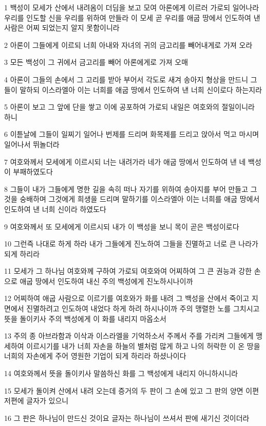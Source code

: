 \par 1 백성이 모세가 산에서 내려옴이 더딤을 보고 모여 아론에게 이르러 가로되 일어나라 우리를 인도할 신을 우리를 위하여 만들라 이 모세 곧 우리를 애굽 땅에서 인도하여 낸 사람은 어찌 되었는지 알지 못함이니라
\par 2 아론이 그들에게 이르되 너희 아내와 자녀의 귀의 금고리를 빼어내게로 가져 오라
\par 3 모든 백성이 그 귀에서 금고리를 빼어 아론에게로 가져 오매
\par 4 아론이 그들의 손에서 그 고리를 받아 부어서 각도로 새겨 송아지 형상을 만드니 그들이 말하되 이스라엘아 이는 너희를 애굽 땅에서 인도하여 낸 너희 신이로다 하는지라
\par 5 아론이 보고 그 앞에 단을 쌓고 이에 공포하여 가로되 내일은 여호와의 절일이니라 하니
\par 6 이튿날에 그들이 일찌기 일어나 번제를 드리며 화목제를 드리고 앉아서 먹고 마시며 일어나서 뛰놀더라
\par 7 여호와께서 모세에게 이르시되 너는 내려가라 네가 애굽 땅에서 인도하여 낸 네 백성이 부패하였도다
\par 8 그들이 내가 그들에게 명한 길을 속히 떠나 자기를 위하여 송아지를 부어 만들고 그것을 숭배하며 그것에게 희생을 드리며 말하기를 이스라엘아 이는 너희를 애굽 땅에서 인도하여 낸 너희 신이라 하였도다
\par 9 여호와께서 또 모세에게 이르시되 내가 이 백성을 보니 목이 곧은 백성이로다
\par 10 그런즉 나대로 하게 하라 내가 그들에게 진노하여 그들을 진멸하고 너로 큰 나라가 되게 하리라
\par 11 모세가 그 하나님 여호와께 구하여 가로되 여호와여 어찌하여 그 큰 권능과 강한 손으로 애굽 땅에서 인도하여 내신 주의 백성에게 진노하시나이까
\par 12 어찌하여 애굽 사람으로 이르기를 여호와가 화를 내려 그 백성을 산에서 죽이고 지면에서 진멸하려고 인도하여 내었다 하게 하려 하시나이까 주의 맹렬한 노를 그치시고 뜻을 돌이키사 주의 백성에게 이 화를 내리지 마옵소서
\par 13 주의 종 아브라함과 이삭과 이스라엘을 기억하소서 주께서 주를 가리켜 그들에게 맹세하여 이르시기를 내가 너희 자손을 하늘의 별처럼 많게 하고 나의 허락한 이 온 땅을 너희의 자손에게 주어 영원한 기업이 되게 하리라 하셨나이다
\par 14 여호와께서 뜻을 돌이키사 말씀하신 화를 그 백성에게 내리지 아니하시니라
\par 15 모세가 돌이켜 산에서 내려 오는데 증거의 두 판이 그 손에 있고 그 판의 양면 이편 저편에 글자가 있으니
\par 16 그 판은 하나님이 만드신 것이요 글자는 하나님이 쓰셔서 판에 새기신 것이더라
